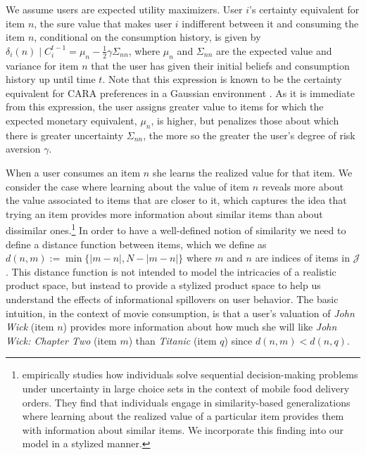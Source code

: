 \documentclass[sigconf]{acmart}
\newcommand{\xhdr}[1]{\vspace{1mm} \noindent{\bf #1}}
\begin{document}
We assume users are expected utility maximizers. User $i$'s certainty equivalent for item $n$, the sure value that makes user $i$ indifferent between it and consuming the item $n$, conditional on the consumption history, is given by
$\delta_{i}(n)\mid C_i^{t-1}=\mu_n-\frac{1}{2}\gamma \Sigma_{nn}$, where $\mu_n$ and $\Sigma_{nn}$ are the expected value and variance for item $n$ that the user has given their initial beliefs and consumption history up until time $t$. Note that this expression is known to be the certainty equivalent for CARA preferences in a Gaussian environment \cite{mas1995microeconomic}. As it is immediate from this expression, the user assigns greater value to items for which the expected monetary equivalent, $\mu_n$, is higher, but penalizes those about which there is greater uncertainty $\Sigma_{nn}$, the more so the greater the user's degree of risk aversion $\gamma$.

\xhdr{User Learning.}
When a user consumes an item $n$ she learns the realized value for that item. We consider the case where  learning about the value of item $n$ reveals more about the value associated to items that are closer to it, which captures the idea that trying an item provides more information about similar items than about dissimilar ones.\footnote{\cite{schulz2019structured} empirically studies how individuals solve sequential decision-making problems under uncertainty in large choice sets in the context of mobile food delivery orders. They find that individuals engage in similarity-based generalizations where learning about the realized value of a particular item provides them with information about similar items. We incorporate this finding into our model in a stylized manner.} In order to have a well-defined notion of similarity we need to define a distance function between items, which we define as $d(n,m):=\min\{ \lvert m - n \rvert ,N - \lvert m - n \rvert \}$ where $m$ and $n$ are indices of items in $\mathcal{J}$. This distance function is not intended to model the intricacies of a realistic product space, but instead to provide a stylized product space to help us understand the effects of informational spillovers on user behavior. The basic intuition, in the context of movie consumption, is that a user's valuation of \textit{John Wick} (item $n$) provides more information about how much she will like \textit{John Wick: Chapter Two} (item $m$) than \textit{Titanic} (item $q$) since $d(n, m) < d(n, q)$. 
\end{document}
